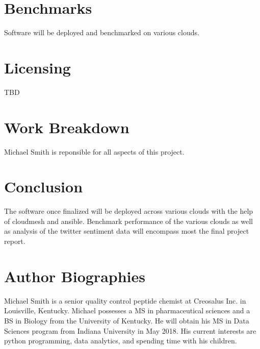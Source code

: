 \documentclass[9pt,twocolumn,twoside]{../../styles/osajnl}
\begin{document}
\section{Benchmarks}

Software will be deployed and benchmarked on various clouds.

\section{Licensing}

TBD

\section{Work Breakdown}

Michael Smith is reponsible for all aspects of this project.

\section{Conclusion}

The software once finalized will be deployed across various clouds with the help of cloudmesh and ansible.  Benchmark performance of the various clouds as well as analysis of the twitter sentiment data will encompass most the final project report.

\section{Author Biographies}

Michael Smith is a senior quality control peptide chemist at Creosalus Inc. in Louisville, Kentucky.  Michael possesses a MS in pharmaceutical sciences and a BS in Biology from the University of Kentucky.  He will obtain his MS in Data Sciences program from Indiana University in May 2018.  His current interests are python programming, data analytics, and spending time with his children.




\end{document}
